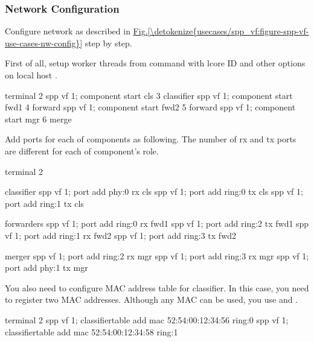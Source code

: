 \documentclass[a4paper,11pt,openany,oneside,english]{sphinxmanual}
\begin{document}
\subsubsection{Network Configuration}
\label{\detokenize{usecases/spp_vf:network-configuration}}
Configure network as described in \hyperref[\detokenize{usecases/spp_vf:figure-spp-vf-use-cases-nw-config}]{Fig.\@ \ref{\detokenize{usecases/spp_vf:figure-spp-vf-use-cases-nw-config}}}
step by step.

First of all, setup worker threads from  command with lcore ID
and other options on local host .

\begin{sphinxVerbatim}[commandchars=\\\{\},formatcom=\footnotesize]
\PYGZsh{} terminal 2
spp \PYGZgt{} vf 1; component start cls 3 classifier
spp \PYGZgt{} vf 1; component start fwd1 4 forward
spp \PYGZgt{} vf 1; component start fwd2 5 forward
spp \PYGZgt{} vf 1; component start mgr 6 merge
\end{sphinxVerbatim}

Add ports for each of components as following.
The number of rx and tx ports are different for each of component’s role.

\begin{sphinxVerbatim}[commandchars=\\\{\},formatcom=\footnotesize]
\PYGZsh{} terminal 2

\PYGZsh{} classifier
spp \PYGZgt{} vf 1; port add phy:0 rx cls
spp \PYGZgt{} vf 1; port add ring:0 tx cls
spp \PYGZgt{} vf 1; port add ring:1 tx cls

\PYGZsh{} forwarders
spp \PYGZgt{} vf 1; port add ring:0 rx fwd1
spp \PYGZgt{} vf 1; port add ring:2 tx fwd1
spp \PYGZgt{} vf 1; port add ring:1 rx fwd2
spp \PYGZgt{} vf 1; port add ring:3 tx fwd2

\PYGZsh{} merger
spp \PYGZgt{} vf 1; port add ring:2 rx mgr
spp \PYGZgt{} vf 1; port add ring:3 rx mgr
spp \PYGZgt{} vf 1; port add phy:1 tx mgr
\end{sphinxVerbatim}

You also need to configure MAC address table for classifier. In this case,
you need to register two MAC addresses. Although any MAC can be used,
you use  and .

\begin{sphinxVerbatim}[commandchars=\\\{\},formatcom=\footnotesize]
\PYGZsh{} terminal 2
spp \PYGZgt{} vf 1; classifier\PYGZus{}table add mac 52:54:00:12:34:56 ring:0
spp \PYGZgt{} vf 1; classifier\PYGZus{}table add mac 52:54:00:12:34:58 ring:1
\end{sphinxVerbatim}
\end{document}
